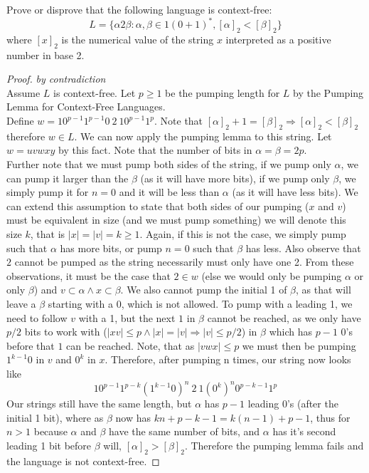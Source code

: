 \documentclass[12pt]{jhwhw}
\begin{document}
\problem{}

	Prove or disprove that the following language is context-free:
	$$
	L = \{\alpha 2\beta : \alpha,\beta \in 1(0+1)^*, [\alpha]_2 < [\beta]_2\}
	$$
	where $[x]_2$ is the numerical value of the string $x$ interpreted as a positive number in base 2.

\solution

	\begin{proof} \textit{by contradiction} \\
		Assume $L$ is context-free. 
		Let $p\geq 1$ be the pumping length for $L$ by the Pumping Lemma for Context-Free Languages. \\
		Define $w=10^{p-1}1^{p-1}0\ 2\ 10^{p-1}1^p$. 
		Note that $[\alpha]_2+1 = [\beta]_2 \Rightarrow [\alpha]_2 < [\beta]_2$ 
		therefore $w\in L$. We can now apply the pumping lemma to this string.
		Let $w=uvwxy$ by this fact. 
		\bigbreak
		Note that the number of bits in $\alpha=\beta=2p$. \\
		Further note that we must pump both sides of the string, if we pump only $\alpha$, we can pump
		it larger than the $\beta$ (as it will have more bits), if we pump only $\beta$, we simply pump it for
		$n=0$ and it will be less than $\alpha$ (as it will have less bits). We can extend this assumption to
		state that both sides of our pumping ($x$ and $v$) must be equivalent in size (and we must pump something)
		we will denote this size $k$, that is $|x|=|v|=k\geq 1$. Again, if this is
		not the case, we simply pump such that $\alpha$ has more bits, or pump $n=0$ such that $\beta$ has less.
		Also observe that $2$ cannot be pumped as the string necessarily must only have one 2. 
		From these observations, it must be the case that
		$2\in w$ (else we would only be pumping $\alpha$ or only $\beta$) 
		and $v\subset \alpha \land x\subset \beta$.
		We also cannot pump the initial 1 of $\beta$, as that will leave a $\beta$ starting with a 0, which is
		not allowed. To pump with a leading 1, we need to follow $v$ with a 1, but the next $1$ in $\beta$ cannot
		be reached, as we only have $p/2$ bits to work with ($|xv|\leq p \land |x|=|v|\Rightarrow |v|\leq p/2$) 
		in $\beta$ which has $p-1$ 
		0's before 
		that $1$ can be reached.
		\bigbreak
		Note, that as $|vwx|\leq p$ we must then be pumping $1^{k-1}0$ in $v$ and $0^{k}$ in $x$.
		Therefore, after pumping n times, our string now looks like
		$$
			10^{p-1}1^{p-k}(1^{k-1}0)^n\ 2\ 1(0^k)^n0^{p-k-1}1^p
		$$
		Our strings still have the same length, but $\alpha$ has $p-1$ leading 0's (after the initial 1 bit), 
		where as $\beta$ now has $kn+p-k-1=k(n-1)+p-1$, thus for $n>1$ because $\alpha$ and $\beta$ have the
		same number of bits, and $\alpha$ has it's second leading 1 bit before $\beta$ will, 
		$[\alpha]_2 > [\beta]_2$. Therefore the pumping lemma fails and the language is not context-free.
	\end{proof}
\end{document}
